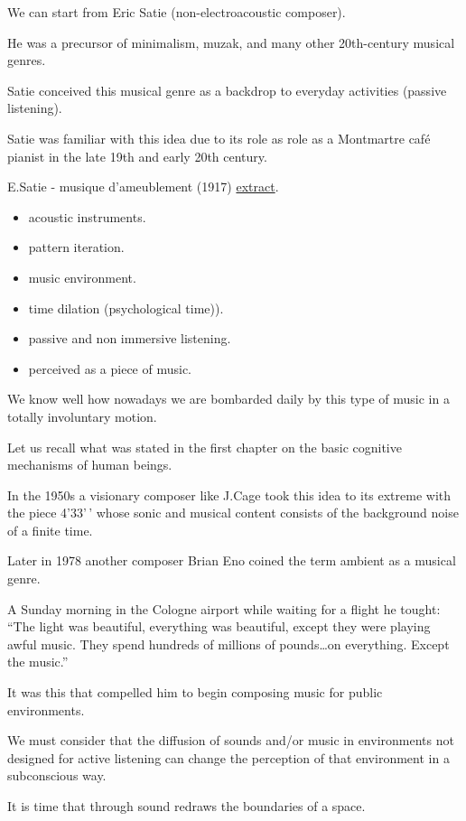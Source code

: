 We can start from Eric Satie (non-electroacoustic composer).

He was a precursor of minimalism, muzak, and many other 20th-century musical genres.

Satie conceived this musical genre as a backdrop to everyday activities (passive listening).

Satie was familiar with this idea due to its role as role as a Montmartre café pianist in the late 19th and early 20th century.

E.Satie - musique d'ameublement (1917) \href{suoni/satie.mp3}{extract}.

\begin{itemize}
\tightlist
\item acoustic instruments.
\item pattern iteration.
\item music environment.
\item time dilation (psychological time)).
\item passive and non immersive listening.
\item perceived as a piece of music.
\end{itemize}

We know well how nowadays we are bombarded daily by this type of music in a totally involuntary motion.

Let us recall what was stated in the first chapter on the basic cognitive mechanisms of human beings.

In the 1950s a visionary composer like J.Cage took this idea to its extreme with the piece 4'33'\,' whose sonic and musical content consists of the background noise of a finite time.

Later in 1978 another composer Brian Eno coined the term ambient as a musical genre.

A Sunday morning in the Cologne airport while waiting for a flight he tought: ``The light was beautiful, everything was beautiful, except they were playing awful music. They spend hundreds of millions of pounds\ldots on everything. Except the music.''

It was this that compelled him to begin composing music for public environments.

We must consider that the diffusion of sounds and/or music in environments not designed for active listening can change the perception of that environment in a subconscious way.

It is time that through sound redraws the boundaries of a space.

